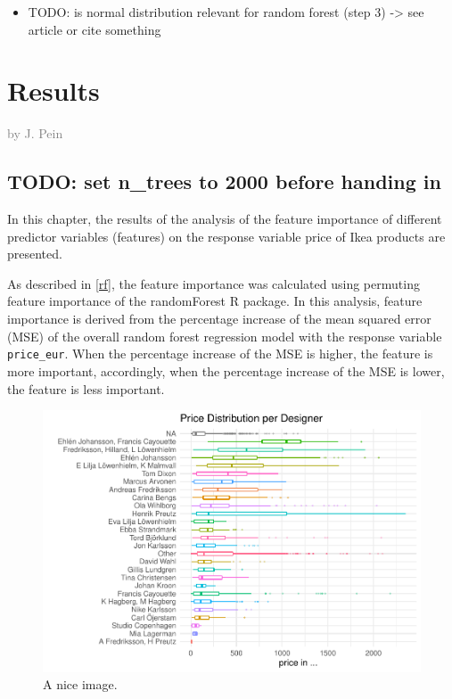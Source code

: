 \documentclass[a4paper, nobind]{templates/ociamthesis}
\providecommand{\tightlist}{%
  \setlength{\itemsep}{0pt}\setlength{\parskip}{0pt}}
\begin{document}
\begin{itemize}
\tightlist
\item
  TODO: is normal distribution relevant for random forest (step 3) -\textgreater{} see article or cite something
\end{itemize}

\hypertarget{results}{%
\chapter{Results}\label{results}}

\hfill\textcolor{gray}{by J. Pein}

\hypertarget{todo-set-n_trees-to-2000-before-handing-in}{%
\section{TODO: set n\_trees to 2000 before handing in}\label{todo-set-n_trees-to-2000-before-handing-in}}

In this chapter, the results of the analysis of the feature importance of different predictor variables (features) on the response variable price of Ikea products are presented.

As described in \ref{rf}, the feature importance was calculated using permuting feature importance of the randomForest R package. In this analysis, feature importance is derived from the percentage increase of the mean squared error (MSE) of the overall random forest regression model with the response variable \texttt{price\_eur}. When the percentage increase of the MSE is higher, the feature is more important, accordingly, when the percentage increase of the MSE is lower, the feature is less important.

\begin{figure}
\includegraphics[width=0.9\linewidth]{_main_files/figure-latex/unnamed-chunk-5-1} \caption{A nice image.}\label{fig:unnamed-chunk-5}
\end{figure}
\end{document}
